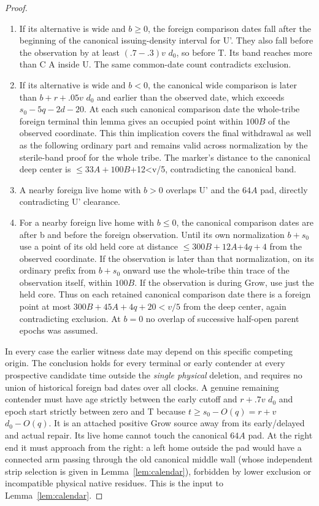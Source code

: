 \begin{proof}
\begin{enumerate}
\item If its alternative is wide and \(b\ge 0\), the foreign comparison dates fall after the beginning of the canonical issuing-density interval for U'. They also fall before the observation by at least \((.7- .3)v\) \(d_0\), so before T. Its band reaches more than C A inside U. The same common-date count contradicts exclusion.
\item If its alternative is wide and \(b<0\), the canonical wide comparison is later than \(b+r+.05v\) \(d_0\) and earlier than the observed date, which exceeds \(s_0- 5q- 2d- 20\). At each such canonical comparison date the whole-tribe foreign terminal thin lemma gives an occupied point within \(100B\) of the observed coordinate. This thin implication covers the final withdrawal as well as the following ordinary part and remains valid across normalization by the sterile-band proof for the whole tribe. The marker's distance to the canonical deep center is \(\le\)\(33A+100B\)+12\textless{}v/5, contradicting the canonical band.
\item A nearby foreign live home with \(b>0\) overlaps U' and the \(64A\) pad, directly contradicting U' clearance.
\item For a nearby foreign live home with \(b\le 0\), the canonical comparison dates are after b and before the foreign observation. Until its own normalization \(b+s_0\) use a point of its old held core at distance \(\le\)\(300B+12A\)+\(4q+4\) from the observed coordinate. If the observation is later than that normalization, on its ordinary prefix from \(b+s_0\) onward use the whole-tribe thin trace of the observation itself, within \(100B\). If the observation is during Grow, use just the held core. Thus on each retained canonical comparison date there is a foreign point at most \(300B+45A+4q+20<v/5\) from the deep center, again contradicting exclusion. At \(b=0\) no overlap of successive half-open parent epochs was assumed.

\end{enumerate}

In every case the earlier witness date may depend on this specific competing origin. The conclusion holds for every terminal or early contender at every prospective candidate time outside the \emph{single physical} deletion, and requires no union of historical foreign bad dates over all clocks. A genuine remaining contender must have age strictly between the early cutoff and \(r+.7v\) \(d_0\) and epoch start strictly between zero and T because \(t\ge s_0- O(q)=r+v\) \(d_0- O(q)\). It is an attached positive Grow source away from its early/delayed and actual repair. Its live home cannot touch the canonical \(64A\) pad. At the right end it must approach from the right: a left home outside the pad would have a connected arm passing through the old canonical middle wall (whose independent strip selection is given in Lemma~\ref{lem:calendar}), forbidden by lower exclusion or incompatible physical native residues. This is the input to Lemma~\ref{lem:calendar}.
\end{proof}

